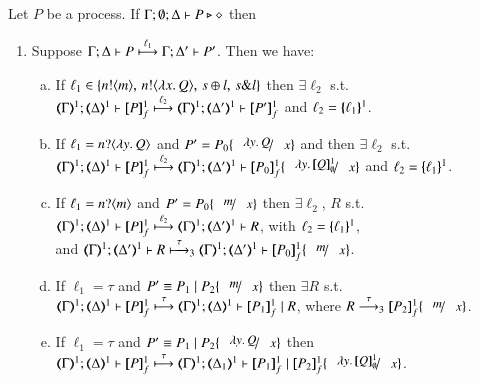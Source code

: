 \begin{proposition}\rm
	\label{prop:op_corr_HOp_to_HO}
	Let $P$ be a \HOp process.
	If $\Gamma; \emptyset; \Delta \proves P \hastype \Proc$ then
	\begin{enumerate}[1.]
		\item
			Suppose $\stytra{\Gamma}{\ell_1}{\Delta}{P}{\Delta'}{P'}$. Then we have:
			\begin{enumerate}[a)]
		    \item 
			If $\ell_1 \in \{\bactout{n}{m}, \,\bactout{n}{\abs{x}Q}, \,\bactsel{s}{l}, \,\bactbra{s}{l}   \}$
			then $\exists \ell_2$ s.t. \\
			$\stytra{\mapt{\Gamma}^{1}}{\ell_2}{\mapt{\Delta}^{1}}{\pmapp{P}{1}{f}}{\mapt{\Delta'}^{1}}{\pmapp{P'}{1}{f}}$
			and $\ell_2 = \mapa{\ell_1}^{1}$.
			
			\item If $\ell_1 = \bactinp{n}{\abs{y}Q}$ and
			$P' = P_0\subst{\abs{y}Q}{x}$ and			
			then $\exists \ell_2$ s.t. \\
			$\stytra{\mapt{\Gamma}^{1}}{\ell_2}{\mapt{\Delta}^{1}}{\pmapp{P}{1}{f}}{\mapt{\Delta'}^{1}}{\pmapp{P_0}{1}{f}\subst{\abs{y}\pmapp{Q}{1}{\emptyset}}{x}}$
			and $\ell_2 = \mapa{\ell_1}^{1}$.
			
			\item If $\ell_1 = \bactinp{n}{m}$
			and 
			$P' = P_0\subst{m}{x}$
			then $\exists \ell_2$, $R$ s.t. \\
			$\stytra{\mapt{\Gamma}^{1}}{\ell_2}{\mapt{\Delta}^{1}}{\pmapp{P}{1}{f}}{\mapt{\Delta'}^{1}}{R}$,
			with $\ell_2 = \mapa{\ell_1}^{1}$, \\
			and
			$\mapt{\Gamma}^{1}; \mapt{\Delta'}^{1} \proves R \hby{\tau}_3
				\mapt{\Gamma}^{1}; \mapt{\Delta'}^{1} \proves \pmapp{P_0}{1}{f}\subst{m}{x}$.
						
			\item If $\ell_1 = \tau$
			and $P' \scong P_1 \Par P_2\subst{m}{x}$
			then $\exists R$ s.t. \\
			$\stytra{\mapt{\Gamma}^{1}}{\tau}{\mapt{\Delta}^{1}}{\pmapp{P}{1}{f}}{\mapt{\Delta}^{1}}{\pmapp{P_1}{1}{f}
			\Par R
			}$, where $R \by{\tau}_3  \pmapp{P_2}{1}{f}\subst{m}{x}$.

			
			
			
			\item If $\ell_1 = \tau$
			and $P' \scong P_1 \Par P_2\subst{\abs{y}Q}{x}$
			then \\
			$\stytra{\mapt{\Gamma}^{1}}{\tau}{\mapt{\Delta}^{1}}{\pmapp{P}{1}{f}}{\mapt{\Delta_1}^{1}}{\pmapp{P_1}{1}{f}
			\Par \pmapp{P_2}{1}{f}\subst{\abs{y}\pmapp{Q}{1}{\emptyset}}{x}
			}$.
			

\end{enumerate}
\end{enumerate}
\end{proposition}
